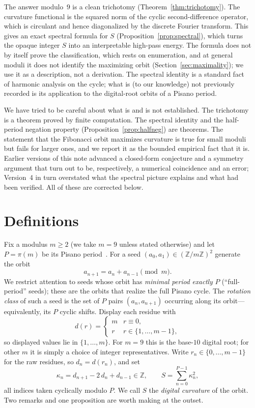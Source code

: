 \documentclass[12pt]{article}
\theoremstyle{remark}
\begin{document}
The answer modulo~$9$ is a clean trichotomy (Theorem~\ref{thm:trichotomy}). The
curvature functional is the squared norm of the cyclic second-difference operator, which
is circulant and hence diagonalized by the discrete Fourier transform. This gives an exact
spectral formula for $S$ (Proposition~\ref{prop:spectral}), which turns the opaque integer
$S$ into an interpretable high-pass energy. The formula does not by itself prove the
classification, which rests on enumeration, and at general moduli it does not identify
the maximizing orbit (Section~\ref{sec:maximality}); we use it as a description, not a
derivation. The spectral identity is a standard fact of harmonic analysis on the cycle;
what is (to our knowledge) not previously recorded is its application to the digital-root
orbits of a Pisano period.

We have tried to be careful about what is and is not established. The trichotomy is a
theorem proved by finite computation. The spectral identity and the half-period negation
property (Proposition~\ref{prop:halfneg}) are theorems. The statement that the Fibonacci
orbit maximizes curvature is true for small moduli but fails for larger ones, and we
report it as the bounded empirical fact that it is. Earlier versions of this note advanced
a closed-form conjecture and a symmetry argument that turn out to be, respectively, a
numerical coincidence and an error; Version~4 in turn overstated what the spectral picture
explains and what had been verified. All of these are corrected below.

\section{Definitions}\label{sec:defs}

Fix a modulus $m\ge 2$ (we take $m=9$ unless stated otherwise) and let $P=\pi(m)$ be its
Pisano period~\cite{Wall1960,Koshy2018}. For a seed $(a_0,a_1)\in(\mathbb Z/m\mathbb Z)^2$ generate the orbit
\[
a_{n+1}=a_n+a_{n-1}\pmod m .
\]
We restrict attention to seeds whose orbit has \emph{minimal period exactly $P$}
(``full-period'' seeds); these are the orbits that realize the full Pisano cycle. The
\emph{rotation class} of such a seed is the set of $P$ pairs $(a_n,a_{n+1})$ occurring
along its orbit---equivalently, its $P$ cyclic shifts. Display
each residue with
\[
d(r)=\begin{cases}m & r\equiv 0,\\ r & r\in\{1,\dots,m-1\},\end{cases}
\]
so displayed values lie in $\{1,\dots,m\}$. For $m=9$ this is the base-$10$ digital root;
for other $m$ it is simply a choice of integer representatives. Write $r_n\in\{0,\dots,m-1\}$
for the raw residues, so $d_n=d(r_n)$, and set
\[
\kappa_n=d_{n+1}-2\,d_n+d_{n-1}\in\mathbb Z,
\qquad
S=\sum_{n=0}^{P-1}\kappa_n^{2},
\]
all indices taken cyclically modulo $P$. We call $S$ the \emph{digital curvature} of the
orbit. Two remarks and one proposition are worth making at the outset.
\end{document}
